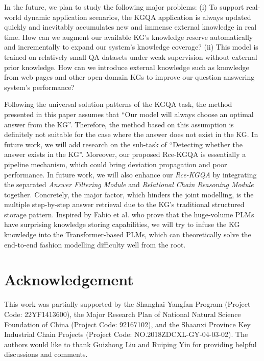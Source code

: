 \documentclass[pdflatex,sn-mathphys]{sn-jnl}%
\theoremstyle{thmstyleone}%
\theoremstyle{thmstyletwo}%
\theoremstyle{thmstylethree}%
\begin{document}
In the future, we plan to study the following major problems: (i) To support real-world dynamic application scenarios, the KGQA application is always updated quickly and inevitably accumulates new and immense external knowledge in real time. How can we augment our available KG's knowledge reserve automatically and incrementally to expand our system's knowledge coverage? (ii) This model is trained on relatively small QA datasets under weak supervision without external prior knowledge. How can we introduce external knowledge such as knowledge from web pages and other open-domain KGs to improve our question answering system's performance?

Following the universal solution patterns of the KGQA task, the method presented in this paper assumes that ``Our model will always choose an optimal answer from the KG''. Therefore, the method based on this assumption is definitely not suitable for the case where the answer does not exist in the KG. In future work, we will add research on the sub-task of ``Detecting whether the answer exists in the KG''. Moreover, our proposed Rce-KGQA is essentially a pipeline mechanism, which could bring deviation propagation and poor performance. In future work, we will also enhance our \textit{Rce-KGQA} by integrating the separated \textit{Answer Filtering Module} and \textit{Relational Chain Reasoning Module} together. Concretely, the major factor, which hinders the joint modelling, is the multiple step-by-step answer retrieval due to the KG's traditional structured storage pattern. Inspired by Fabio et al. \cite{fabioemnlp} who prove that the huge-volume PLMs have surprising knowledge storing capabilities, we will try to infuse the KG knowledge into the Transformer-based PLMs, which can theoretically solve the end-to-end fashion modelling difficulty well from the root.

\section*{Acknowledgement}
This work was partially supported by the Shanghai Yangfan Program (Project Code: 22YF1413600), the Major Research Plan of National Natural Science Foundation of China (Project Code: 92167102), and the Shaanxi Province Key Industrial Chain Projects (Project Code: NO.2018ZDCXL-GY-04-03-02). The authors would like to thank Guizhong Liu and Ruiping Yin for providing helpful discussions and comments.
\end{document}
